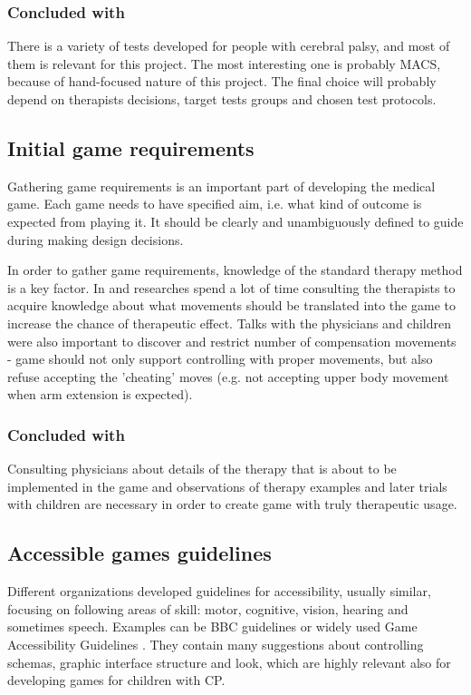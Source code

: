 \subsubsection{Concluded with}
There is a variety of tests developed for people with cerebral palsy, and most of them is relevant for this project. The most interesting one is probably MACS, because of hand-focused nature of this project. The final choice will probably depend on therapists decisions, target tests groups and chosen test protocols.

\subsection{Initial game requirements}
Gathering game requirements is an important part of developing the medical game. Each game needs to have specified aim, i.e. what kind of outcome is expected from playing it. It should be clearly and unambiguously defined to guide during making design decisions. 

In order to gather game requirements, knowledge of the standard therapy method is a key factor. In \cite{exercise} and \cite{tabletop} researches spend a lot of time consulting the therapists to acquire knowledge about what movements should be translated into the game to increase the chance of therapeutic effect. Talks with the physicians and children were also important to discover and restrict number of compensation movements - game should not only support controlling with proper movements, but also refuse accepting the 'cheating' moves (e.g. not accepting upper body movement when arm extension is expected).

\subsubsection{Concluded with}
Consulting physicians about details of the therapy that is about to be implemented in the game and observations of therapy examples and later trials with children are necessary in order to create game with truly therapeutic usage. 

\subsection{Accessible games guidelines}
Different organizations developed guidelines for accessibility, usually similar, focusing on following areas of skill: motor, cognitive, vision, hearing and sometimes speech. Examples can be BBC guidelines \cite{BBC} or widely used Game Accessibility Guidelines \cite{gag}. They contain many suggestions about controlling schemas, graphic interface structure and look, which are highly relevant also for developing games for children with CP. 

